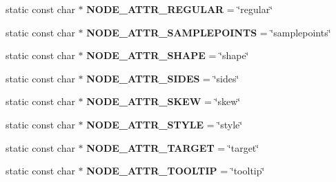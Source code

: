 \begin{DoxyCompactItemize}
\item 
static const char $\ast$ {\bfseries N\+O\+D\+E\+\_\+\+A\+T\+T\+R\+\_\+\+R\+E\+G\+U\+L\+AR} = \char`\"{}regular\char`\"{}\hypertarget{classmemgraph_1_1_graphviz_attrs_aa1ea249877323de55cbb7cedbb1c308b}{}\label{classmemgraph_1_1_graphviz_attrs_aa1ea249877323de55cbb7cedbb1c308b}

\item 
static const char $\ast$ {\bfseries N\+O\+D\+E\+\_\+\+A\+T\+T\+R\+\_\+\+S\+A\+M\+P\+L\+E\+P\+O\+I\+N\+TS} = \char`\"{}samplepoints\char`\"{}\hypertarget{classmemgraph_1_1_graphviz_attrs_a5f94afe497382f386bf81b4ffb3cb556}{}\label{classmemgraph_1_1_graphviz_attrs_a5f94afe497382f386bf81b4ffb3cb556}

\item 
static const char $\ast$ {\bfseries N\+O\+D\+E\+\_\+\+A\+T\+T\+R\+\_\+\+S\+H\+A\+PE} = \char`\"{}shape\char`\"{}\hypertarget{classmemgraph_1_1_graphviz_attrs_ae8053197383a7a07bb937937302d04b6}{}\label{classmemgraph_1_1_graphviz_attrs_ae8053197383a7a07bb937937302d04b6}

\item 
static const char $\ast$ {\bfseries N\+O\+D\+E\+\_\+\+A\+T\+T\+R\+\_\+\+S\+I\+D\+ES} = \char`\"{}sides\char`\"{}\hypertarget{classmemgraph_1_1_graphviz_attrs_a108d0d85f0cb1df3e3a48407d145e62a}{}\label{classmemgraph_1_1_graphviz_attrs_a108d0d85f0cb1df3e3a48407d145e62a}

\item 
static const char $\ast$ {\bfseries N\+O\+D\+E\+\_\+\+A\+T\+T\+R\+\_\+\+S\+K\+EW} = \char`\"{}skew\char`\"{}\hypertarget{classmemgraph_1_1_graphviz_attrs_a27121c27e78bbb34c43f5f3facb0c52b}{}\label{classmemgraph_1_1_graphviz_attrs_a27121c27e78bbb34c43f5f3facb0c52b}

\item 
static const char $\ast$ {\bfseries N\+O\+D\+E\+\_\+\+A\+T\+T\+R\+\_\+\+S\+T\+Y\+LE} = \char`\"{}style\char`\"{}\hypertarget{classmemgraph_1_1_graphviz_attrs_acbb19fbf019a30fcc322f818bca2124f}{}\label{classmemgraph_1_1_graphviz_attrs_acbb19fbf019a30fcc322f818bca2124f}

\item 
static const char $\ast$ {\bfseries N\+O\+D\+E\+\_\+\+A\+T\+T\+R\+\_\+\+T\+A\+R\+G\+ET} = \char`\"{}target\char`\"{}\hypertarget{classmemgraph_1_1_graphviz_attrs_a75fea24b2f4d3fda66f25c8d53a36406}{}\label{classmemgraph_1_1_graphviz_attrs_a75fea24b2f4d3fda66f25c8d53a36406}

\item 
static const char $\ast$ {\bfseries N\+O\+D\+E\+\_\+\+A\+T\+T\+R\+\_\+\+T\+O\+O\+L\+T\+IP} = \char`\"{}tooltip\char`\"{}\hypertarget{classmemgraph_1_1_graphviz_attrs_adaddebb51f47ec21f34413179de58b4b}{}\label{classmemgraph_1_1_graphviz_attrs_adaddebb51f47ec21f34413179de58b4b}


\end{DoxyCompactItemize}
